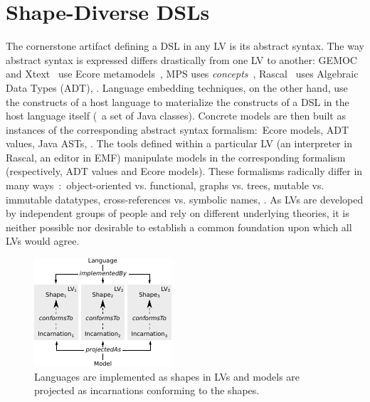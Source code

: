 \section{Shape-Diverse DSLs}
\label{sec:shapes}

The cornerstone artifact defining a DSL in any LV is its abstract syntax.
The way abstract syntax is expressed differs drastically from one LV to another: GEMOC~\cite{bousse2016execution} and Xtext~\cite{bettini2016implementing} use Ecore metamodels~\cite{steinberg2008emf}, MPS uses \emph{concepts}~\cite{voelter2014generic}, Rascal~\cite{klint2010easy} uses Algebraic Data Types (ADT), \etc.
Language embedding techniques, on the other hand, use the constructs of a host language to materialize the constructs of a DSL in the host language itself (\eg~a set of Java classes).
Concrete models are then built as instances of the corresponding abstract syntax formalism:~Ecore models, ADT values, Java ASTs, \etc.
The tools defined within a particular LV (an interpreter in Rascal, an editor in EMF) manipulate models in the corresponding formalism (respectively, ADT values and Ecore models).
These formalisms radically differ in many ways~\cite{klint2016model}:~object-oriented vs. functional, graphs vs. trees, mutable vs. immutable datatypes, cross-references vs. symbolic names, \etc.
As LVs are developed by independent groups of people and rely on different underlying theories, it is neither possible nor desirable to establish a common foundation upon which all LVs would agree.

\begin{figure}[bt]
	\centering
	\includegraphics[width=.64\columnwidth]{figures/shape-diverse-lang-3}
	\caption{Languages are implemented as shapes in LVs and models are projected as incarnations conforming to the shapes.}
	\label{fig:concepts}
\end{figure}

